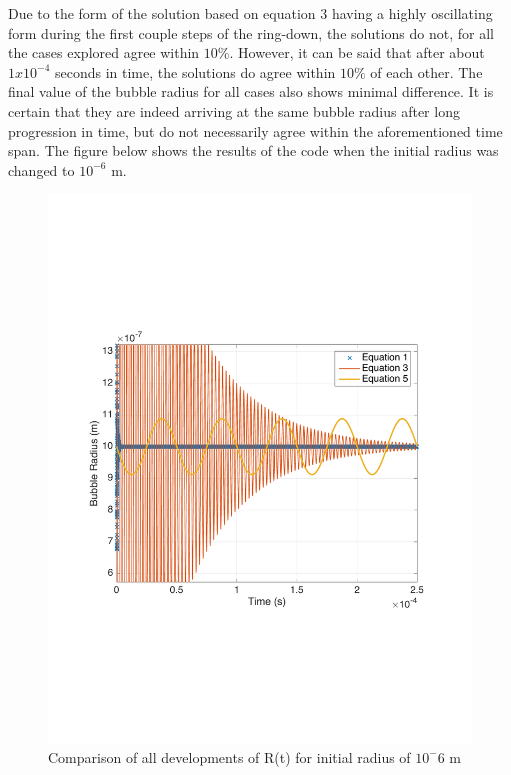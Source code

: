 \documentclass[12pt]{article}
\begin{document}
\begin{enumerate}
\newpage
Due to the form of the solution based on equation 3 having a highly oscillating form during the first couple steps of the ring-down, the solutions do not, for all the cases explored agree within $10\%$. However, it can be said that after about $1x10^{-4}$ seconds in time, the solutions do agree within $10\%$ of each other. The final value of the bubble radius for all cases also shows minimal difference. It is certain that they are indeed arriving at the same bubble radius after long progression in time, but do not necessarily agree within the aforementioned time span. The figure below shows the results of the code when the initial radius was changed to $10^{-6}$ m.
\begin{figure}[h]
\includegraphics[scale = 0.5]{Ro_small}
\centering
\caption{Comparison of all developments of R(t) for initial radius of $10^-6$ m}
\end{figure}
\end{enumerate}
\end{document}
